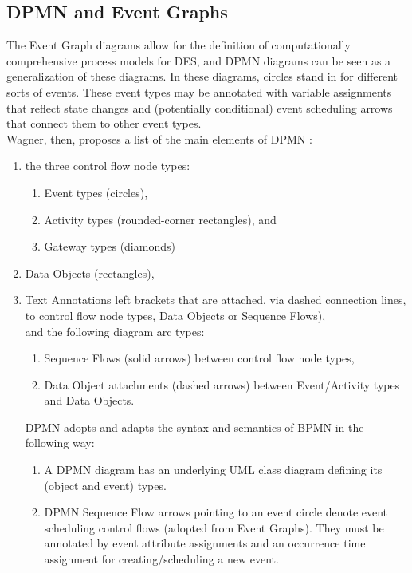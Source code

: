 \documentclass{article}
\begin{document}
\subsection{DPMN and Event Graphs}

The Event Graph diagrams allow for the definition of computationally comprehensive process models for DES, and DPMN diagrams can be seen as a generalization of these diagrams. In these diagrams, circles stand in for different sorts of events. These event types may be annotated with variable assignments that reflect state changes and (potentially conditional) event scheduling arrows that connect them to other event types.\\
Wagner, then, proposes a list of the main elements of DPMN \cite{Wagner}:

\begin{enumerate}
\item the three control flow node types:
	\begin{enumerate}
		\item Event types (circles),
		\item Activity types (rounded-corner rectangles), and
		\item Gateway types (diamonds)
	\end{enumerate}
\item Data Objects (rectangles),
\item Text Annotations left brackets that are attached, via dashed connection lines, to control flow node types, Data Objects or Sequence Flows),\\
and the following diagram arc types:
	\begin{enumerate}
		\item Sequence Flows (solid arrows) between control flow node types,
		\item Data Object attachments (dashed arrows) between Event/Activity types and Data 				Objects.
	\end{enumerate}
DPMN adopts and adapts the syntax and semantics of BPMN in the following way:
	\begin{enumerate}
		\item A DPMN diagram has an underlying UML class diagram defining its (object and event) types.
		\item DPMN Sequence Flow arrows pointing to an event circle denote event scheduling control flows (adopted from Event Graphs). They must be annotated by event attribute assignments and an occurrence time assignment for creating/scheduling a new event.
	\end{enumerate}

\end{enumerate}
\end{document}
